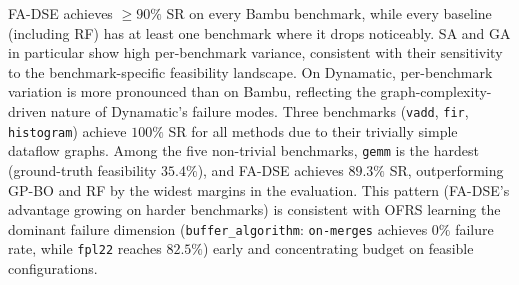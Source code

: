 \documentclass[journal]{IEEEtran}
\begin{document}
FA-DSE achieves $\geq 90\%$ SR on every Bambu benchmark, while every baseline (including RF) has at least one benchmark where it drops noticeably. SA and GA in particular show high per-benchmark variance, consistent with their sensitivity to the benchmark-specific feasibility landscape. On Dynamatic, per-benchmark variation is more pronounced than on Bambu, reflecting the graph-complexity-driven nature of Dynamatic's failure modes. Three benchmarks (\texttt{vadd}, \texttt{fir}, \texttt{histogram}) achieve $100\%$ SR for all methods due to their trivially simple dataflow graphs. Among the five non-trivial benchmarks, \texttt{gemm} is the hardest (ground-truth feasibility $35.4\%$), and FA-DSE achieves $89.3\%$ SR, outperforming GP-BO and RF by the widest margins in the evaluation. This pattern (FA-DSE's advantage growing on harder benchmarks) is consistent with OFRS learning the dominant failure dimension (\texttt{buffer\_algorithm}: \texttt{on-merges} achieves $0\%$ failure rate, while \texttt{fpl22} reaches $82.5\%$) early and concentrating budget on feasible configurations.
\end{document}
